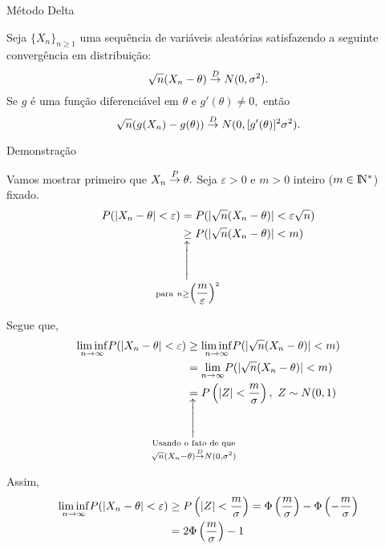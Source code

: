 \documentclass[12pt]{beamer}
\begin{document}

\begin{frame}{Método Delta}
\begin{Teorema}
\justifying
Seja $\{X_{n}\}_{n\geq 1}$ uma sequência de variáveis aleatórias satisfazendo a seguinte convergência em distribuição:
$$\sqrt{n}(X_{n}-\theta)\overset{D}{\rightarrow} N(0,\sigma^{2}).$$ Se $g$ é uma função diferenciável em $\theta$ e $g'(\theta)\neq 0,$ então $$\sqrt{n}(g(X_{n})-g(\theta))\overset{D}{\rightarrow} N(0, [g'(\theta)]^{2}\sigma^{2}).$$
\end{Teorema}
\end{frame}

\begin{frame}{Demonstração}
\begin{block}{}
\justifying
Vamos mostrar primeiro que $X_{n}\overset{P}{\rightarrow} \theta.$ Seja $\varepsilon>0$ e $m>0$ inteiro ($m\in \rm I\!N^{*}$) fixado. 
\begin{align*}
    P(|X_{n}-\theta|<\varepsilon)&=P(|\sqrt{n}(X_{n}-\theta)|<\varepsilon\sqrt{n})\\
    &\SetaUP{\text{para}~n\geq \Big(\dfrac{m}{\varepsilon}\Big)^{2}}{\geq} P(|\sqrt{n}(X_{n}-\theta)|<m)
\end{align*}
\end{block}
\end{frame}

\begin{frame}{}
\vspace{-0.2cm}
\begin{block}{}
\justifying
Segue que, 
\begin{align*}
    \LimInf P(|X_{n}-\theta|<\varepsilon)&\geq \LimInf P(|\sqrt{n}(X_{n}-\theta)|<m)\\
    &=\Lim P(|\sqrt{n}(X_{n}-\theta)|<m)\\
    &\SetaUP{\text{Usando o fato de que}\\ \sqrt{n}(X_{n}-\theta)\ConvD N(0,\sigma^{2})}{=}P\left(|Z|<\frac{m}{\sigma}\right),~Z\sim N(0,1)
\end{align*}
\end{block}
\pause
\vspace{-0.2cm}
\begin{block}{}
\justifying
Assim,
\begin{align*}
    {\displaystyle \liminf_{n\to\infty}} P(|X_{n}-\theta|<\varepsilon)&\geq P\left(|Z|<\frac{m}{\sigma}\right)=\Phi\left(\frac{m}{\sigma}\right)-\Phi\left(-\frac{m}{\sigma}\right)\\
    &=2\Phi\left(\frac{m}{\sigma}\right)-1
\end{align*}
\end{block}
\end{frame}
\end{document}
